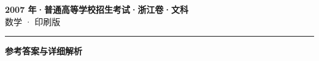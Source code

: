 \documentclass[zihao=5, a4paper]{ctexart}
\begin{document}
\begin{center}
  {\Large\bfseries 2007 年·普通高等学校招生考试·浙江卷·文科}\\[4pt]
  {\large 数学 · 印刷版}
\end{center}
\medskip
{}

\par\bigskip\hrule\bigskip
{}
\begin{center}{\large\bfseries 参考答案与详细解析}\end{center}
\smallskip

\end{document}
